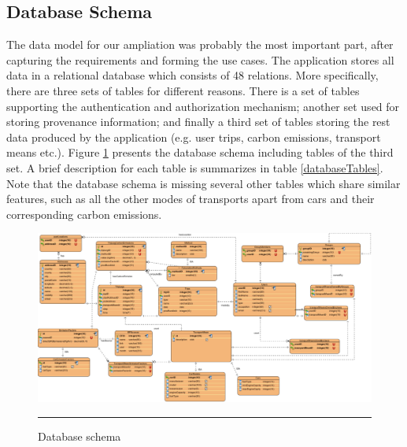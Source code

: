 \subsection{Database Schema}

The data model for our ampliation was probably the most important part, after capturing the requirements and forming the use cases. The application stores all data in a relational database which consists of 48 relations. More specifically, there are three sets of tables for different reasons. There is a set of tables supporting the authentication and authorization mechanism; another set used for storing provenance information; and finally a third set of tables storing the rest data produced by the application (e.g. user trips, carbon emissions, transport means etc.). Figure \ref{fig:databaseSchema} presents the database schema including tables of the third set. A brief description for each table is summarizes in table \ref{databaseTables}. Note that the database schema is missing several other tables which share similar features, such as all the other modes of transports apart from cars and their corresponding carbon emissions.

\begin{landscape}
    \begin{figure}[htbp]
	\centering
		\includegraphics[scale=0.43]{./Figures/chapter4/figure9.pdf}
		\rule{35em}{0.5pt}
	\caption[Database schema]{Database schema}
	\label{fig:databaseSchema}
\end{figure}
\end{landscape}

